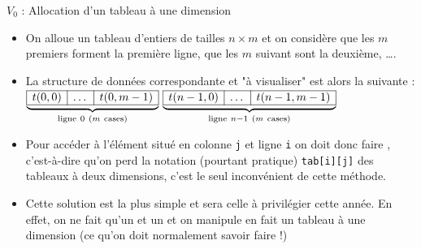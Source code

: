\documentclass[10pt]{beamer}
\begin{document}
\begin{frame}[fragile]{\Ctitle}{\stitle}
	\begin{block}{$V_0$ : Allocation d'un tableau à une dimension}
		\begin{itemize}
			\item<1-> On alloue un tableau d'entiers de tailles $n \times m$ et on considère que les $m$ premiers forment la première ligne, que les $m$ suivant sont la deuxième, \dots.
			\item<2-> La structure de données correspondante et "à visualiser" est alors la suivante : \\
				$\underbrace{\begin{array}{|c|c|c|} \hline t(0,0)& \dots & t(0,m-1)\\ \hline \end{array}}_{\mathrm{ligne\ }0 \ (m \mathrm{\ cases})}$
				\dotfill
				$\underbrace{\begin{array}{|c|c|c|} \hline t(n-1,0)& \dots & t(n-1,m-1)\\ \hline \end{array}}_{\mathrm{ligne\ }n-1 \ (m \mathrm{\ cases})}$
			\item<3-> Pour accéder à l'élément situé en colonne {\tt j} et ligne {\tt i} on doit donc faire , c'est-à-dire qu'on perd la notation (pourtant pratique) {\tt tab[i][j]} des tableaux à deux dimensions, c'est le seul inconvénient de cette méthode.
			\item<4-> \textcolor{BrickRed}{Cette solution est la plus simple et sera celle à privilégier cette année}. En effet, on ne fait qu'un  et un  et on manipule en fait un tableau à une dimension (ce qu'on doit normalement savoir faire !)
		\end{itemize}
	\end{block}
\end{frame}
\end{document}
